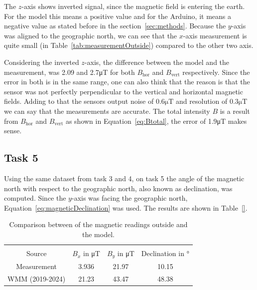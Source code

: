 \documentclass[DIV=14]{scrartcl}
\begin{document}
    The $z$-axis shows inverted signal, since the magnetic field is entering the earth.
    For the model this means a positive value and for the Arduino, it means a negative value as stated before in the section~\ref{sec:methods}.
    Because the $y$-axis was aligned to the geographic north, we can see that the $x$-axis measurement is quite small (in Table~\ref{tab:measurementOutside})
    compared to the other two axis.

    Considering the inverted $z$-axis, the difference between the model and the measurement, was 2.09 and 2.7\si{\micro\tesla} for both
    $B_{\mathrm{hor}}$ and $B_{\mathrm{vert}}$ respectively.
    Since the error in both is in the same range, one can also think that the reason is that the sensor was not perfectly
    perpendicular to the vertical and horizontal magnetic fields.
    Adding to that the sensors output noise of $0.6\si{\micro\tesla}$ and resolution of $0.3\si{\micro\tesla}$ we can say
    that the measurements are accurate.
    The total intensity $B$ is a result from $B_{\mathrm{hor}}$ and $B_{\mathrm{vert}}$ as shown in Equation~\ref{eq:Btotal},
    the error of 1.9\si{\micro\tesla} makes sense.

    \subsection*{Task 5}
    Using the same dataset from task 3 and 4, on task 5 the angle of the magnetic north with respect to the
    geographic north, also known as declination, was computed.
    Since the $y$-axis was facing the geographic north, Equation~\ref{eq:magneticDeclination} was used.
    The results are shown in Table~\ref{}.

    \begin{table}[!ht]
        \centering
        \begin{tabular}{cS[table-format=1.3]S[table-format=1.3]S[table-format=1.3]}
            \hline \vspace{-1em} \\
            Source           & {$B_x$ in \si{\micro\tesla}} & {$B_{y}$ in \si{\micro\tesla}} & {Declination in \si{\degree}} \\ \hline
            Measurement      & 3.936                        & 21.97                          & 10.15                         \\
            WMM (2019-2024)  & 21.23                        & 43.47                          & 48.38                         \\ \hline
        \end{tabular}
        \caption{Comparison between of the magnetic readings outside and the model.}
        \label{tab:declination}
    \end{table}
\end{document}
